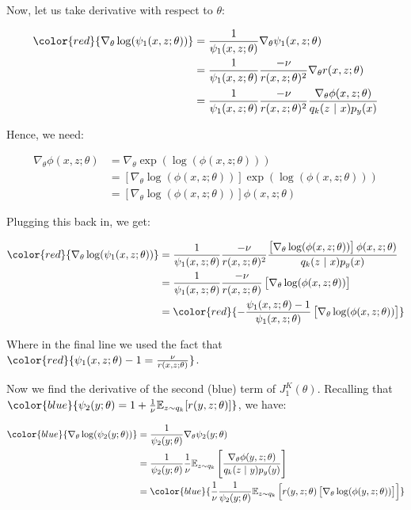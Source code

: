 \documentclass[11pt, oneside]{article}
\begin{document}
Now, let us take derivative with respect to $\theta$:

\begin{align}
\color{red}{ \nabla_{\theta} \log(\psi_1(x, z; \theta))} 
           & = \frac{1}{\psi_1(x, z; \theta)} \nabla_{\theta} \psi_1(x, z; \theta) \\
           & = \frac{1}{\psi_1(x, z; \theta)} \frac{-\nu}{r(x, z; \theta)^2} \nabla_{\theta} r(x, z; \theta) \\
           & = \frac{1}{\psi_1(x, z; \theta)} \frac{-\nu}{r(x, z; \theta)^2} \frac{\nabla_{\theta} \phi(x, z; \theta)}{q_k(z \ | \ x)p_y(x)}
\end{align}

Hence, we need:

\begin{align}
\nabla_{\theta} \phi(x, z; \theta) & = \nabla_{\theta} \exp ( \log ( \phi(x, z; \theta) ) ) \\
          & = \left[ \nabla_{\theta} \log(\phi(x, z; \theta)) \right] \exp ( \log ( \phi(x, z; \theta) ) )\\
          & = \left[ \nabla_{\theta} \log(\phi(x, z; \theta)) \right] \phi(x, z; \theta) 
\end{align}

Plugging this back in, we get:

\begin{align}
\color{red}{ \nabla_{\theta} \log(\psi_1(x, z; \theta))} 
    & = \frac{1}{\psi_1(x, z; \theta)} 
        \frac{-\nu}{r(x, z; \theta)^2} 
        \frac{\left[ \nabla_{\theta} \log(\phi(x, z; \theta)) \right] \phi(x, z; \theta)}{q_k(z \ | \ x)p_y(x)} \\
    & = \frac{1}{\psi_1(x, z; \theta)} 
        \frac{-\nu}{r(x, z; \theta)} 
        \left[ \nabla_{\theta} \log(\phi(x, z; \theta)) \right] \\
    & = \color{red}{- \frac{\psi_1(x, z; \theta) - 1}{\psi_1(x, z; \theta)} 
        \left[ \nabla_{\theta} \log(\phi(x, z; \theta)) \right]} \\
\end{align}

Where in the final line we used the fact that $\color{red}{\psi_1(x, z; \theta) - 1 = \frac{\nu}{r(x, z; \theta)}}$.

Now we find the derivative of the second (blue) term of $J_1^K(\theta)$. Recalling that $\color{blue}{\psi_2(y; \theta) = 1 + \frac{1}{\nu} \mathbb{E}_{z \sim q_k}[r(y, z; \theta)]}$, we have:

\begin{align}
\color{blue}{\nabla_{\theta} \log(\psi_2(y; \theta))}
    & = \frac{1}{\psi_2(y; \theta)} \nabla_{\theta} \psi_2(y; \theta) \\
    & = \frac{1}{\psi_2(y; \theta)} 
        \frac{1}{\nu} \mathbb{E}_{z \sim q_k} 
        \left[ \frac{\nabla_{\theta} \phi(y, z; \theta)}{q_k(z \ | \ y)p_y(y)} \right] \\  
    & = \color{blue}{\frac{1}{\nu} 
        \frac{1}{\psi_2(y; \theta)} 
        \mathbb{E}_{z \sim q_k} \left[ r(y, z; \theta) \left[ \nabla_{\theta} \log(\phi(y, z; \theta)) \right] \right]} \\
\end{align}
\end{document}
